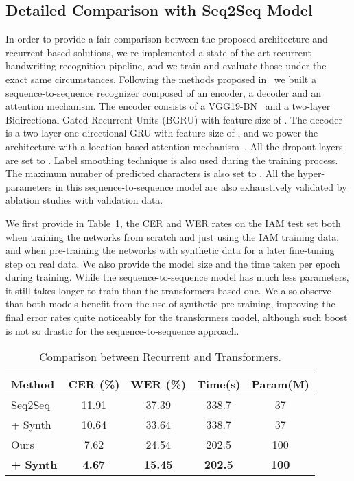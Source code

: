 \documentclass[10pt,twocolumn,letterpaper]{article}
\begin{document}
\subsection{Detailed Comparison with Seq2Seq Model}
\label{sec:adv_s2s}
In order to provide a fair comparison between the proposed architecture and recurrent-based solutions, we re-implemented a state-of-the-art recurrent handwriting recognition pipeline, and we train and evaluate those under the exact same circumstances. Following the methods proposed in~\cite{kang2018convolve,michael2019evaluating} we built a sequence-to-sequence recognizer composed of an encoder, a decoder and an attention mechanism. The encoder consists of a VGG19-BN~\cite{simonyan2014very} and a two-layer Bidirectional Gated Recurrent Units (BGRU) with feature size of . The decoder is a two-layer one directional GRU with feature size of , and we power the architecture with a location-based attention mechanism~\cite{chorowski2015attention}. All the dropout layers are set to . Label smoothing technique is also used during the training process. The maximum number of predicted characters is also set to . All the hyper-parameters in this sequence-to-sequence model are also exhaustively validated by ablation studies with validation data.

We first provide in Table~\ref{tab:comp}, the CER and WER rates on the IAM test set both when training the networks from scratch and just using the IAM training data, and when pre-training the networks with synthetic data for a later fine-tuning step on real data. We also provide the model size and the time taken per epoch during training. While the sequence-to-sequence model has much less parameters, it still takes longer to train than the transformers-based one. We also observe that both models benefit from the use of synthetic pre-training, improving the final error rates quite noticeably for the transformers model, although such boost is not so drastic for the sequence-to-sequence approach. 

\begin{table}[t!h]
    \caption{Comparison between Recurrent and Transformers.}
    \label{tab:comp}
    \centering
    \begin{tabular}{lcccc}
    \toprule
    Method & CER (\%) & WER (\%) & Time(s) & Param(M)\\
    \midrule
    Seq2Seq & 11.91 & 37.39 & 338.7 & 37\\
    + Synth & 10.64 & 33.64 & 338.7 & 37\\
    \midrule
    Ours & 7.62 & 24.54 & 202.5 & 100\\
    \textbf{+ Synth} & \textbf{4.67} & \textbf{15.45} & \textbf{202.5} & \textbf{100}\\
    \bottomrule
    \end{tabular}
\end{table}
\end{document}
